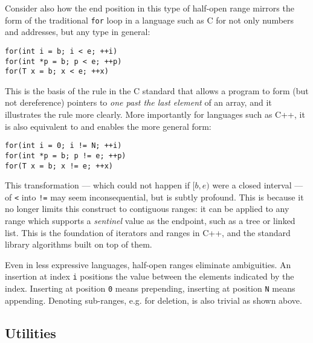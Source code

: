 \begin{figure}[ht]
    \centering
    
\end{figure}

Consider also how the end position in this type of half-open range mirrors the
form of the traditional \texttt{for} loop in a language such as C for not only
numbers and addresses, but any type in general:

\begin{lstlisting}[style=c]
for(int i = b; i < e; ++i)
for(int *p = b; p < e; ++p)
for(T x = b; x < e; ++x)
\end{lstlisting}

This is the basis of the rule in the C standard that allows a program to form
(but not dereference) pointers to \textit{one past the last element} of an
array, and it illustrates the rule more clearly.  More importantly for languages
such as C++, it is also equivalent to and enables the more general form:

\begin{lstlisting}[style=c]
for(int i = 0; i != N; ++i)
for(int *p = b; p != e; ++p)
for(T x = b; x != e; ++x)
\end{lstlisting}

This transformation --- which could not happen if $[b,e)$ were a closed interval
--- of \texttt{<} into \texttt{!=} may seem inconsequential, but is subtly
profound.  This is because it no longer limits this construct to contiguous
ranges\footnotemark: it can be applied to any range which supports a
\textit{sentinel} value as the endpoint, such as a tree or linked list.  This is
the foundation of iterators and ranges in C++, and the standard library
algorithms built on top of them.


Even in less expressive languages, half-open ranges eliminate ambiguities.  An
insertion at index \texttt{i} positions the value between the elements indicated
by the index.  Inserting at position \texttt{0} means prepending, inserting at
position \texttt{N} means appending.  Denoting sub-ranges, e.g. for deletion, is
also trivial as shown above.

\subsection{Utilities}

